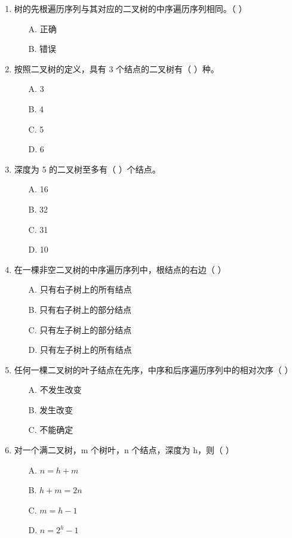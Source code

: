 \documentclass[12pt, a4paper]{article}
\begin{document}
\begin{enumerate}[label=\arabic*.]
	\item 树的先根遍历序列与其对应的二叉树的中序遍历序列相同。（ ）
	      \begin{enumerate}
		      \item[A.] 正确
		      \item[B.] 错误
	      \end{enumerate}

	\item 按照二叉树的定义，具有 3 个结点的二叉树有（ ）种。
	      \begin{enumerate}
		      \item[A.] 3
		      \item[B.] 4
		      \item[C.] 5
		      \item[D.] 6
	      \end{enumerate}

	\item 深度为 5 的二叉树至多有（ ）个结点。
	      \begin{enumerate}
		      \item[A.] 16
		      \item[B.] 32
		      \item[C.] 31
		      \item[D.] 10
	      \end{enumerate}

	\item 在一棵非空二叉树的中序遍历序列中，根结点的右边（ ）
	      \begin{enumerate}
		      \item[A.] 只有右子树上的所有结点
		      \item[B.] 只有右子树上的部分结点
		      \item[C.] 只有左子树上的部分结点
		      \item[D.] 只有左子树上的所有结点
	      \end{enumerate}

	\item 任何一棵二叉树的叶子结点在先序，中序和后序遍历序列中的相对次序（ ）
	      \begin{enumerate}
		      \item[A.] 不发生改变
		      \item[B.] 发生改变
		      \item[C.] 不能确定
	      \end{enumerate}

	\item 对一个满二叉树，m 个树叶，n 个结点，深度为 h，则（ ）
	      \begin{enumerate}
		      \item[A.] $n=h+m$
		      \item[B.] $h+m=2n$
		      \item[C.] $m=h-1$
		      \item[D.] $n=2^h-1$
	      \end{enumerate}


\end{enumerate}
\end{document}
